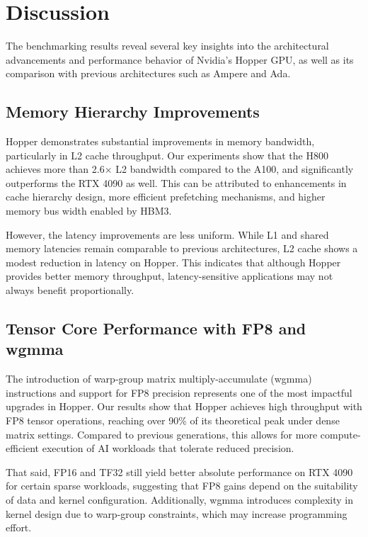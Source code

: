 \section{Discussion}

The benchmarking results reveal several key insights into the architectural advancements and performance behavior of Nvidia's Hopper GPU, as well as its comparison with previous architectures such as Ampere and Ada.

\subsection{Memory Hierarchy Improvements}

Hopper demonstrates substantial improvements in memory bandwidth, particularly in L2 cache throughput. Our experiments show that the H800 achieves more than 2.6× L2 bandwidth compared to the A100, and significantly outperforms the RTX 4090 as well. This can be attributed to enhancements in cache hierarchy design, more efficient prefetching mechanisms, and higher memory bus width enabled by HBM3.

However, the latency improvements are less uniform. While L1 and shared memory latencies remain comparable to previous architectures, L2 cache shows a modest reduction in latency on Hopper. This indicates that although Hopper provides better memory throughput, latency-sensitive applications may not always benefit proportionally.

\subsection{Tensor Core Performance with FP8 and wgmma}

The introduction of warp-group matrix multiply-accumulate (wgmma) instructions and support for FP8 precision represents one of the most impactful upgrades in Hopper. Our results show that Hopper achieves high throughput with FP8 tensor operations, reaching over 90\% of its theoretical peak under dense matrix settings. Compared to previous generations, this allows for more compute-efficient execution of AI workloads that tolerate reduced precision.

That said, FP16 and TF32 still yield better absolute performance on RTX 4090 for certain sparse workloads, suggesting that FP8 gains depend on the suitability of data and kernel configuration. Additionally, wgmma introduces complexity in kernel design due to warp-group constraints, which may increase programming effort.

